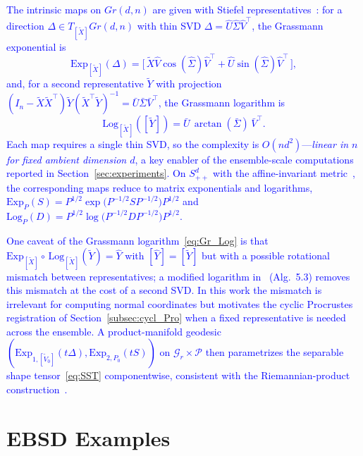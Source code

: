 \documentclass[pdflatex,iicol]{sn-jnl}%
\theoremstyle{thmstyleone}%
\theoremstyle{thmstyletwo}%
\theoremstyle{thmstylethree}%
\begin{document}
\begin{appendices}
\textcolor{blue}{The intrinsic maps on $Gr(d,n)$ are given with Stiefel representatives~\cite{edelman1998geometry,bendokat2020grassmann}: for a direction $\Delta \in T_{[\widetilde{X}]}Gr(d,n)$ with thin SVD $\Delta = \widehat{U}\widehat{\Sigma}\widehat{V}^{\top}$, the Grassmann exponential is
\begin{equation}\label{eq:Gr_Exp}
    \mathrm{Exp}_{[\widetilde{X}]}(\Delta) = \big[\,\widetilde{X}\widehat{V}\cos(\widehat{\Sigma})\widehat{V}^{\top} + \widehat{U}\sin(\widehat{\Sigma})\widehat{V}^{\top}\,\big],
\end{equation}
and, for a second representative $\widetilde{Y}$ with projection $(I_n - \widetilde{X}\widetilde{X}^{\top})\widetilde{Y}(\widetilde{X}^{\top}\widetilde{Y})^{-1} = \bar U \bar\Sigma \bar V^{\top}$, the Grassmann logarithm is
\begin{equation}\label{eq:Gr_Log}
    \mathrm{Log}_{[\widetilde{X}]}([\widetilde{Y}]) = \bar U\,\arctan(\bar\Sigma)\,\bar V^{\top}.
\end{equation}
Each map requires a single thin SVD, so the complexity is $O(nd^2)$---\emph{linear in $n$ for fixed ambient dimension $d$}, a key enabler of the ensemble-scale computations reported in Section~\ref{sec:experiments}. On $S^d_{++}$ with the affine-invariant metric~\cite{fletcher2003statistics,pennec2020manifold}, the corresponding maps reduce to matrix exponentials and logarithms, $\mathrm{Exp}_P(S) = P^{1/2}\exp\!\big(P^{-1/2}SP^{-1/2}\big)P^{1/2}$ and $ \mathrm{Log}_P(D) = P^{1/2}\log\!\big(P^{-1/2}DP^{-1/2}\big)P^{1/2}$.
}

\textcolor{blue}{One caveat of the Grassmann logarithm~\eqref{eq:Gr_Log} is that $\mathrm{Exp}_{[\widetilde{X}]}\!\circ\,\mathrm{Log}_{[\widetilde{X}]}(\widetilde{Y}) = \widehat{Y}$ with $[\widehat{Y}]=[\widetilde{Y}]$ but with a possible rotational mismatch between representatives; a modified logarithm in~\cite{bendokat2020grassmann} (Alg.~5.3) removes this mismatch at the cost of a second SVD. In this work the mismatch is irrelevant for computing normal coordinates but motivates the cyclic Procrustes registration of Section~\ref{subsec:cycl_Pro} when a fixed representative is needed across the ensemble. A product-manifold geodesic $(\mathrm{Exp}_{1,[\widetilde{V}_0]}(t\Delta),\mathrm{Exp}_{2,P_0}(tS))$ on $\mathcal{G}_r\times\mathcal{P}$ then parametrizes the separable shape tensor~\eqref{eq:SST} componentwise, consistent with the Riemannian-product construction~\cite{grey2023separable}.}

\section{EBSD Examples}\label{secA1}


\end{appendices}
\end{document}
